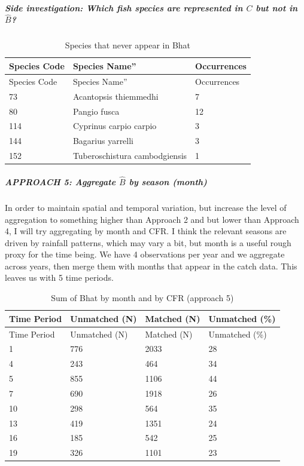 \documentclass[
]{article}
\begin{document}
\hypertarget{side-investigation-which-fish-species-are-represented-in-c-but-not-in-hatb}{%
\subparagraph{\texorpdfstring{\textbf{Side investigation:} Which fish
species are represented in \(C\) but not in
\(\hat{B}\)?}{Side investigation: Which fish species are represented in C but not in \textbackslash hat\{B\}?}}\label{side-investigation-which-fish-species-are-represented-in-c-but-not-in-hatb}}

\begin{longtable}[]{@{}lll@{}}
\caption{Species that never appear in Bhat}\tabularnewline
\toprule
Species Code & Species Name'' & Occurrences \\
\midrule
\endfirsthead
\toprule
Species Code & Species Name'' & Occurrences \\
\midrule
\endhead
73 & Acantopsis thiemmedhi & 7 \\
80 & Pangio fusca & 12 \\
114 & Cyprinus carpio carpio & 3 \\
144 & Bagarius yarrelli & 3 \\
152 & Tuberoschistura cambodgiensis & 1 \\
\bottomrule
\end{longtable}

\hfill\break
\hfill\break

\hypertarget{approach-5-aggregate-hatb-by-season-month}{%
\subparagraph{\texorpdfstring{\textbf{APPROACH 5: Aggregate \(\hat{B}\)
by season
(month)}}{APPROACH 5: Aggregate \textbackslash hat\{B\} by season (month)}}\label{approach-5-aggregate-hatb-by-season-month}}

\hfill\break
\hfill\break
In order to maintain spatial and temporal variation, but increase the
level of aggregation to something higher than Approach 2 and but lower
than Approach 4, I will try aggregating by month and CFR. I think the
relevant seasons are driven by rainfall patterns, which may vary a bit,
but month is a useful rough proxy for the time being. We have 4
observations per year and we aggregate across years, then merge them
with months that appear in the catch data. This leaves us with 5 time
periods.

\begin{longtable}[]{@{}llll@{}}
\caption{Sum of Bhat by month and by CFR (approach 5)}\tabularnewline
\toprule
Time Period & Unmatched (N) & Matched (N) & Unmatched (\%) \\
\midrule
\endfirsthead
\toprule
Time Period & Unmatched (N) & Matched (N) & Unmatched (\%) \\
\midrule
\endhead
1 & 776 & 2033 & 28 \\
4 & 243 & 464 & 34 \\
5 & 855 & 1106 & 44 \\
7 & 690 & 1918 & 26 \\
10 & 298 & 564 & 35 \\
13 & 419 & 1351 & 24 \\
16 & 185 & 542 & 25 \\
19 & 326 & 1101 & 23 \\
\bottomrule
\end{longtable}
\end{document}
